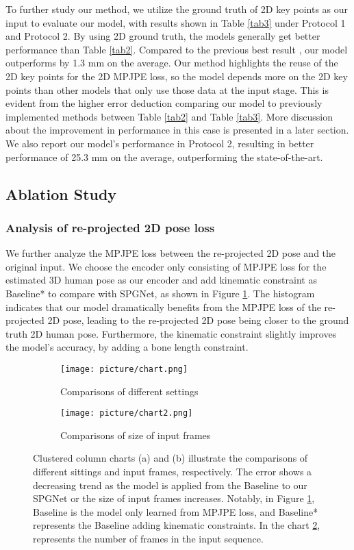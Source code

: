 \documentclass[runningheads]{llncs}
\begin{document}
To further study our method, we utilize the ground truth of 2D key points as our input to evaluate our model, with results shown in Table \ref{tab3} under Protocol 1 and Protocol 2. By using 2D ground truth, the models generally get better performance than Table \ref{tab2}. Compared to the previous best result \cite{Liu_2020_CVPR}, our model outperforms by 1.3 mm on the average. Our method highlights the reuse of the 2D key points for the 2D MPJPE loss, so the model depends more on the 2D key points than other models that only use those data at the input stage. This is evident from the higher error deduction comparing our model to previously implemented methods between Table \ref{tab2} and Table \ref{tab3}. More discussion about the improvement in performance in this case is presented in a later section. We also report our model's performance in Protocol 2, resulting in better performance of 25.3 mm on the average, outperforming the state-of-the-art.


\subsection{Ablation Study}

\subsubsection{Analysis of re-projected 2D pose loss} We further analyze the MPJPE loss between the re-projected 2D pose and the original input. We choose the encoder only consisting of MPJPE loss for the estimated 3D human pose as our encoder and add kinematic constraint as Baseline* to compare with SPGNet, as shown in Figure \ref{fig:sub1}. The histogram indicates that our model dramatically benefits from the MPJPE loss of the re-projected 2D pose, leading to the re-projected 2D pose being closer to the ground truth 2D human pose. Furthermore, the kinematic constraint slightly improves the model's accuracy, by adding a bone length constraint.

\begin{figure}[!htp]
\centering
\begin{subfigure}{.5\textwidth}
  \centering
  \texttt{[image: picture/chart.png]}
  \caption{Comparisons of different settings}
  \label{fig:sub1}
\end{subfigure}\begin{subfigure}{.5\textwidth}
  \centering
  \texttt{[image: picture/chart2.png]}
  \caption{Comparisons of size of input frames}
  \label{fig:sub2}
\end{subfigure}
\caption{Clustered column charts (a) and (b) illustrate the comparisons of different sittings and input frames, respectively. The error shows a decreasing trend as the model is applied from the Baseline to our SPGNet or the size of input frames increases. Notably, in Figure \ref{fig:sub1}, Baseline is the model only learned from MPJPE loss, and Baseline* represents the Baseline adding kinematic constraints. In the chart \ref{fig:sub2},  represents the number of frames in the input sequence.}
\label{fig:ablation}
\end{figure}
\end{document}

